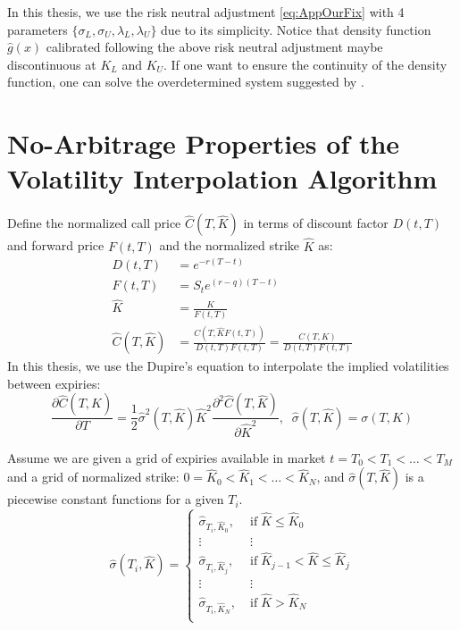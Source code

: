 \documentclass[letterpaper,12pt,titlepage,oneside,final]{book}
\numberwithin{equation}{section}
\theoremstyle{definition}
\begin{document}
In this thesis, we  use the  risk neutral adjustment \eqref{eq:AppOurFix} with 4 parameters  $\{\sigma_{L},\sigma_{U}, \lambda_{L}, \lambda_{U}\}$ due to its simplicity. Notice that density function $\hat{g}(x)$ calibrated following the above risk neutral adjustment maybe discontinuous at $K_L$ and $K_U$.  If one want to ensure the continuity of the density function,  one can solve the overdetermined system suggested by \citet{brunner2003arbitrage}.


 \chapter{No-Arbitrage Properties of the Volatility Interpolation Algorithm}
 \label{App:LVFProof}
 Define the normalized call price $\widehat{C}(T,\widehat{K})$ in terms of discount factor $D(t,T)$ and forward price $F(t,T)$ and the normalized strike $\widehat{K}$ as:
 \[
 \begin{split}
 D(t,T)&=e^{-r(T-t)}\\
 F(t,T)&=S_te^{(r-q)(T-t)}\\
 \widehat{K}&=\frac{K}{F(t,T)}\\
 \widehat{C}(T,\widehat{K})&=\frac{C(T,\widehat{K} F(t,T))}{D(t,T)F(t,T)}=\frac{C(T,K)}{D(t,T)F(t,T)}
 \end{split}
 \]
 In this thesis, we use the Dupire's equation to interpolate the implied volatilities between expiries:
 \[
 \frac{\partial \widehat{C}(T,\widehat{K})}{\partial T}=\frac{1}{2} \widehat{\sigma}^2(T,\widehat{K}) \widehat{K}^2  \frac{\partial^2 \widehat{C}(T,\widehat{K})}{ \partial \widehat{K}^2},\;\; \widehat{\sigma}(T,\widehat{K})={\sigma}(T,K)
 \]
 
 
 
 
 
 
 Assume we are given a grid of expiries available in market $t=T_0 < T_1 < \dots< T_{M} $ and  a grid of normalized strike: $0=\widehat{K}_0<\widehat{K}_1<\dots<\widehat{K}_{N}$, and $\widehat{\sigma}(T,\widehat{K})$  is a piecewise constant functions for a given $T_i$.
 \begin{equation}
	 \widehat{\sigma}(T_i,\widehat{K})=\left\{ \begin{array}{ll}
		 \widehat{\sigma}_{T_i,\widehat{K}_0}  , \; &\text{if} \; \widehat{K} \leq \widehat{K}_0\\
		 \vdots & \vdots\\
		 \widehat{\sigma}_{T_i,\widehat{K}_j}  , \; &\text{if} \; \widehat{K}_{j-1}<\widehat{K} \leq \widehat{K}_j\\
		 \vdots & \vdots\\
		 \widehat{\sigma}_{T_i,\widehat{K}_{N}} , \; &\text{if} \;  \widehat{K} > \widehat{K}_{N} \\
		 \end{array} \right.
		 \label{eq:AppLVFVolDef}
	 \end{equation}
\end{document}
